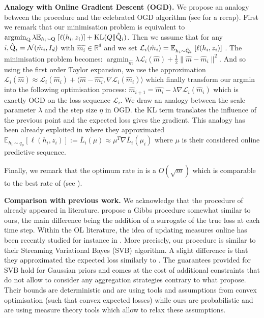 \textbf{Analogy with Online Gradient Descent (OGD).} We propose an analogy between the procedure  and the celebrated OGD algorithm (see  for a recap). First we remark that our minimisation problem is equivalent to
$\operatorname{argmin}_{\mathrm{Q}} \lambda\mathbb{E}_{h_i\sim \mathrm{Q}} \; [\ell(h_i,z_i)] + \operatorname{KL}(Q\| \hat{\mathrm{Q}}_{i})$.
Then we assume that for any $i, \hat{\mathrm{Q}}_i=\mathcal{N}(\hat{m}_i,I_d)$ with $\hat{m_i}\in\mathbb{R}^d$  and we set $\mathcal{L}_i(\hat{m}_i)= \mathbb{E}_{h_i\sim \hat{\mathrm{Q}}_i} \; [\ell(h_i,z_i)] $ .
The minimisation problem becomes: $\operatorname{argmin}_{\hat{m}} \lambda\mathcal{L}_i(\hat{m}) + \frac{1}{2} \| \hat{m} - \hat{m}_i \|^2$.
And so using the first order Taylor expansion, we use the approximation $ \mathcal{L}_i(\hat{m}) \approx \mathcal{L}_i(\hat{m}_i ) + \langle \hat{m}- \hat{m_i}, \nabla \mathcal{L}_i(\hat{m}_i) \rangle $ which finally transform our argmin into the following optimisation process: $\hat{m}_{i+1} = \hat{m_i} - \lambda \nabla \mathcal{L}_i(\hat{m}_i)$ which is exactly OGD on the loss sequence $\mathcal{L}_i$.
We draw an analogy between the scale parameter $\lambda$ and the step size $\eta$ in OGD. the KL term translates the influence of the previous point and the expected loss gives the gradient.
This analogy has been already exploited in \citet{shalev2012online} where they approximated $\mathbb{E}_{h_i\sim q_\mu} [\ell(h_i,z_i)]:= \bar{L}_i(\mu) \approx \mu^T\nabla \bar{L}_i(\mu_i)$ where $\mu$ is their considered online predictive sequence.

Finally, we remark that the optimum rate in  is a $O(\sqrt{m})$ which is comparable to the best rate of \citet[][Eq (2.5)]{shalev2012online} (see ).



\textbf{Comparison with previous work.} We acknowledge that the procedure of  already appeared in literature. \citet[][Alg. 1]{li2018pac} propose a Gibbs procedure somewhat similar to ours, the main difference being the addition of a surrogate of the true loss at each time step.
Within the OL literature, the idea of updating measures online has been recently studied for instance in \citet{cherief2019generalization}. More precisely, our procedure is similar to their Streaming Variational Bayes (SVB) algorithm. A slight difference is that they approximated the expected loss similarly to \citet{shalev2012online}.
The guarantees \citet{cherief2019generalization} provided for SVB hold for Gaussian priors and comes at the cost of additional constraints that do not allow to consider any aggregation strategies contrary to what  propose. Their bounds are deterministic and are using tools and assumptions from convex optimisation (such that convex expected losses) while ours are probabilistic and are using measure theory tools which allow to relax these assumptions.

